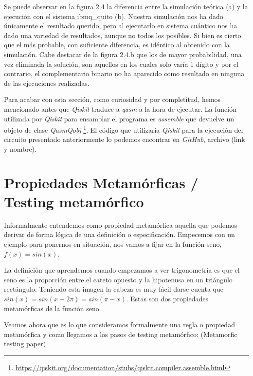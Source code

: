 Se puede observar en la figura 2.4 la diferencia entre la simulación teórica (a) y la ejecución con el sistema ibmq\_quito (b). Nuestra simulación nos ha dado únicamente el resultado querido, pero al ejecutarlo en sistema cuántico nos ha dado una variedad de resultados, aunque no todos los posibles. Si bien es cierto que el más probable, con suficiente diferencia, es idéntico al obtenido con la simulación. Cabe destacar de la figura 2.4.b que los de mayor probabilidad, una vez eliminada la solución, son aquellos en los cuales solo varía 1 dígito y por el contrario, el complementario binario no ha aparecido como resultado en ninguna de las ejecuciones realizadas.

Para acabar con esta sección, como curiosidad y por completitud, hemos mencionado antes que \textit{Qiskit} traduce a \textit{qasm} a la hora de ejecutar. La función utilizada por \textit{Qiskit} para ensamblar el programa es \textit{assemble} que devuelve un objeto de clase \textit{QasmQobj} \footnote[1]{\url{https://qiskit.org/documentation/stubs/qiskit.compiler.assemble.html}}. El código que utilizaría \textit{Qiskit} para la ejecución del circuito presentado anteriormente lo podemos encontrar en \textit{GitHub}, archivo (link y nombre).

\section{Propiedades Metamórficas / Testing metamórfico}

Informalmente entendemos como propiedad metamórfica aquella que podemos derivar de forma lógica de una definición o especificación. Empecemos con un ejemplo para ponernos en situación, nos vamos a fijar en la función seno, $f(x)=sin(x)$.\newline

La definición que aprendemos cuando empezamos a ver trigonometría es que el seno es la proporción entre el cateto opuesto y la hipotenusa en un triángulo rectángulo. Teniendo esta imagen la cabeza es muy fácil darse cuenta que $sin(x)=sin(x + 2\pi)=sin(\pi-x)$. Estas son dos propiedades metamórficas de la función seno. \newline

Veamos ahora que es lo que consideramos formalmente una regla o propiedad metamórfica y como llegamos a los pasos de testing metamórfico: (Metamorfic testing paper)

\newpage

